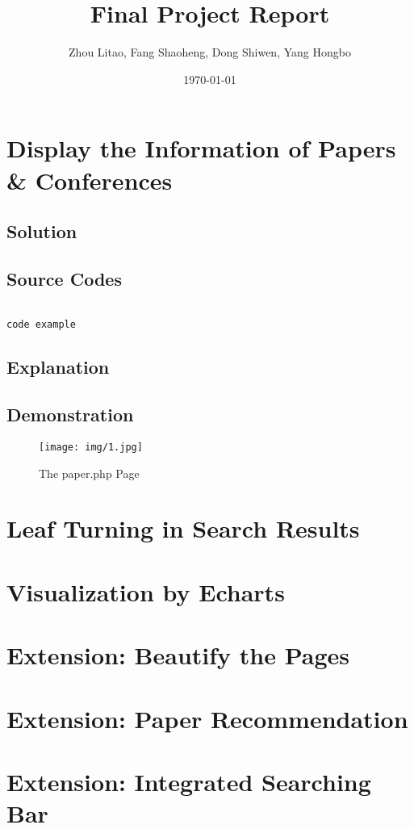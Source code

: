 \documentclass{article}
\begin{document}
\title{Final Project Report}
\author{Zhou Litao, Fang Shaoheng, Dong Shiwen, Yang Hongbo}
\date{\today}


\maketitle
\tableofcontents

\section{Display the Information of Papers \& Conferences}

\subsection{Solution}

\subsection{Source Codes}

\begin{minipage}[r]{15em}
\begin{verbatim}

code example

\end{verbatim}
\end{minipage}

\subsection{Explanation}

\subsection{Demonstration}

\begin{figure}[H]
\centering
\texttt{[image: img/1.jpg]}
\caption{The paper.php Page}
\end{figure}


\section{Leaf Turning in Search Results}


\section {Visualization by Echarts}

\section {Extension: Beautify the Pages}

\section {Extension: Paper Recommendation}

\section {Extension: Integrated Searching Bar}
\end{document}
